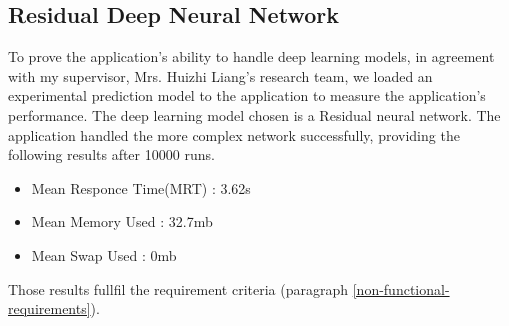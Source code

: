 		\subsection{Residual Deep Neural Network}
			To prove the application's ability to handle deep learning models, in agreement with my supervisor, Mrs. Huizhi Liang's 
			research team, we loaded an experimental prediction model to the application to measure the application's performance. 
			The deep learning model chosen is a Residual neural network. The application handled the more complex network successfully, 
			providing the following results after 10000 runs.
			\begin{itemize}
				\item Mean Responce Time(MRT) : 3.62s
				\item Mean Memory Used : 32.7mb
				\item Mean Swap Used : 0mb
			\end{itemize}
			Those results fullfil the requirement criteria (paragraph \ref{non-functional-requirements}).
			
			
		

